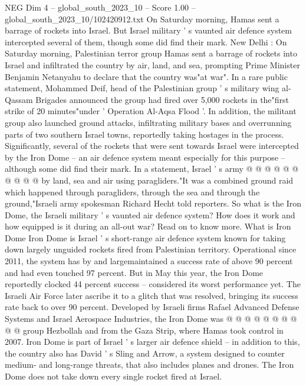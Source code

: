 \begin{textsample}{NEG Dim 4 – global\_south\_2023\_10 – Score 1.00 – global\_south\_2023\_10/102420912.txt}  \label{ex:f4_neg_035}
On Saturday morning, Hamas sent a barrage of rockets into Israel.
But Israel military ' s vaunted air defence system intercepted several of them, though some did find their mark.
New Delhi : On Saturday morning, Palestinian terror group Hamas sent a barrage of rockets into Israel and infiltrated the country by air, land, and sea, prompting Prime Minister Benjamin Netanyahu to declare that the country was"at war".
In a rare public statement, Mohammed Deif, head of the Palestinian group ' s military wing al-Qassam Brigades announced the group had fired over 5,000 rockets in the"first strike of 20 minutes"under ' Operation Al-Aqsa Flood '.
In addition, the militant group also launched ground attacks, infiltrating military bases and overrunning parts of two southern Israel towns, reportedly taking hostages in the process.
Significantly, several of the rockets that were sent towards Israel were intercepted by the Iron Dome -- an air defence system meant especially for this purpose -- although some did find their mark.
In a statement, Israel ' s army @ @ @ @ @ @ @ @ @ @ by land, sea and air using paragliders."It was a combined ground raid which happened through paragliders, through the sea and through the ground,"Israeli army spokesman Richard Hecht told reporters.
So what is the Iron Dome, the Israeli military ' s vaunted air defence system?
How does it work and how equipped is it during an all-out war?
Read on to know more.
What is Iron Dome Iron Dome is Israel ' s short-range air defence system known for taking down largely unguided rockets fired from Palestinian territory.
Operational since 2011, the system has by and largemaintained a success rate of above 90 percent and had even touched 97 percent.
But in May this year, the Iron Dome reportedly clocked 44 percent success -- considered its worst performance yet.
The Israeli Air Force later ascribe it to a glitch that was resolved, bringing its success rate back to over 90 percent.
Developed by Israeli firms Rafael Advanced Defense Systems and Israel Aerospace Industries, the Iron Dome was @ @ @ @ @ @ @ @ @ @ group Hezbollah and from the Gaza Strip, where Hamas took control in 2007.
Iron Dome is part of Israel ' s larger air defence shield -- in addition to this, the country also has David ' s Sling and Arrow, a system designed to counter medium- and long-range threats, that also includes planes and drones.
The Iron Dome does not take down every single rocket fired at Israel.

\end{textsample}

